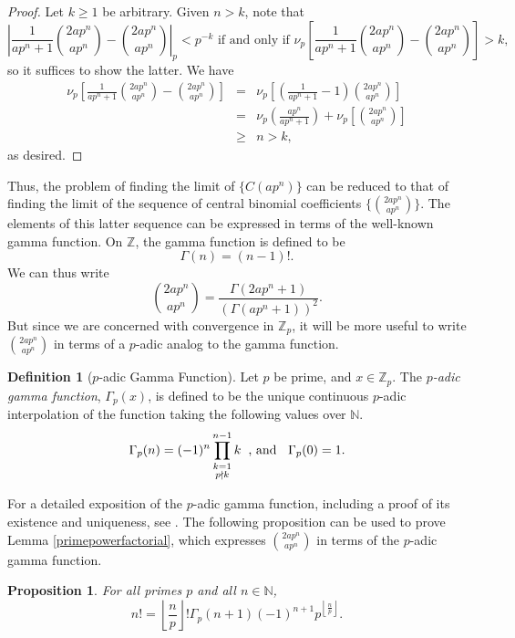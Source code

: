 \documentclass[12pt, letter]{article}    %
\theoremstyle{plain}
\newtheorem{proposition}[theorem]{Proposition}
\theoremstyle{definition}
\newtheorem{definition}[theorem]{Definition}
\numberwithin{equation}{section}
\newcommand{\naturals}{\mathbb{N}}
\newcommand{\lemref}[1]{Lemma \ref{#1}}
\newcommand{\thlabel}[1]{\label{#1}}
\providecommand{\floor}[1]{\left \lfloor #1 \right \rfloor }
\begin{document}
\begin{proof}
Let $k\geq 1$ be arbitrary. Given $n>k$, note that
$$\left|\frac{1}{ap^n+1}\binom{2ap^n}{ap^n}-\binom{2ap^n}{ap^n}\right|_p<p^{-k} \text{ if and only if } \nu_p\left[\frac{1}{ap^n+1}\binom{2ap^n}{ap^n}-\binom{2ap^n}{ap^n}\right]>k,$$ so it suffices to show the latter. We have
\begin{eqnarray*}
\nu_p\left[\frac{1}{ap^n+1}\binom{2ap^n}{ap^n}-\binom{2ap^n}{ap^n}\right]&=&\nu_p\left[\left(\frac{1}{ap^n+1}-1\right)\binom{2ap^n}{ap^n}\right]\\
&=&\nu_p\left(\frac{ap^n}{ap^n+1}\right)+ \nu_p\left[\binom{2ap^n}{ap^n}\right] \\
&\geq& n> k,
\end{eqnarray*} 
as desired.
\end{proof}
\noindent Thus, the problem of finding the limit of $\{C(ap^n)\}$ can be reduced to that of finding the limit of the sequence of central binomial coefficients $\{{2ap^n \choose ap^n}\}$. The elements of this latter sequence can be expressed in terms of the well-known gamma function. On $\mathbb{Z}$, the gamma function is defined to be
$$\Gamma(n)=(n-1)!.$$
We can thus write $${2ap^n \choose ap^n}=\frac{\Gamma(2ap^n+1)}{(\Gamma(ap^n+1))^2}.$$ But since we are concerned with convergence in $\mathbb{Z}_p$, it will be more useful to write  ${2ap^n \choose ap^n}$ in terms of a $p$-adic analog to the gamma function.

\begin{definition}[$p$-adic Gamma Function]
Let $p$ be prime, and $x\in \mathbb{Z}_p$. The \textit{$p$-adic gamma function}, $\Gamma_p(x)$, is defined to be the unique continuous $p$-adic interpolation of the function taking the following values over $\mathbb{N}$.
$$\Gamma_p(n)=(-1)^n\prod_{\substack{k=1\\p\nmid k}}^{n-1} k \hspace{2mm}\text{, and }\hspace{2mm}  \Gamma_p(0)=1.$$
\end{definition}
For a detailed exposition of the $p$-adic gamma function, including a proof of its existence and uniqueness, see \cite{FG}. The following proposition can be used to prove \lemref{primepowerfactorial}, which expresses ${2ap^n \choose ap^n}$ in terms of the $p$-adic gamma function.

\begin{proposition}\thlabel{factorialgamma}
For all primes $p$ and all $n\in\naturals$, 
$$n!=\floor{\frac{n}{p}}!\Gamma_p(n+1)(-1)^{n+1}p^{\floor{\frac{n}{p}}}.$$
\end{proposition}
\end{document}
